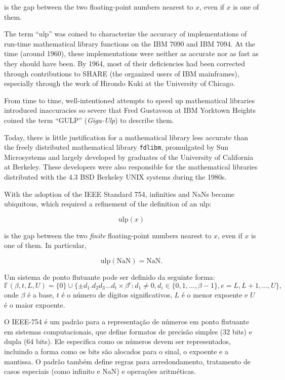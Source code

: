 is the gap between the two floating-point numbers nearest to $x$, 
even if $x$ is one of them.

The term ``ulp'' was coined to characterize the accuracy of implementations 
of run-time mathematical library functions on the IBM 7090 and IBM 7094. 
At the time (around 1960), these implementations were neither as accurate 
nor as fast as they should have been. By 1964, most of their deficiencies 
had been corrected through contributions to SHARE (the organized users of 
IBM mainframes), especially through the work of Hirondo Kuki at the 
University of Chicago.

From time to time, well-intentioned attempts to speed up mathematical 
libraries introduced inaccuracies so severe that Fred Gustavson at 
IBM Yorktown Heights coined the term ``GULP'' (\textit{Giga-Ulp}) to 
describe them. 

Today, there is little justification for a mathematical library less 
accurate than the freely distributed mathematical library \texttt{fdlibm}, 
promulgated by Sun Microsystems and largely developed by graduates of the 
University of California at Berkeley. These developers were also responsible 
for the mathematical libraries distributed with the 4.3 BSD Berkeley UNIX 
systems during the 1980s.

With the adoption of the IEEE Standard 754, infinities and NaNs became 
ubiquitous, which required a refinement of the definition of an ulp:

\begin{equation}
\mathrm{ulp}(x)
\end{equation}

is the gap between the two \textit{finite} floating-point numbers nearest 
to $x$, even if $x$ is one of them. In particular,

\begin{equation}
\mathrm{ulp}(\mathrm{NaN}) = \mathrm{NaN}.
\end{equation}

Um sistema de ponto flutuante pode ser definido da seguinte forma:
\begin{equation}
\mathbb{F}(\beta, t, L, U) = \{0\} \cup \{\pm d_1.d_2d_3 \ldots d_t \times \beta^e : d_1 \neq 0, d_i \in \{0, 1, \ldots, \beta-1\}, e = L, L+1, \ldots, U\},
\end{equation}
onde $\beta$ é a base, $t$ é o número de dígitos significativos, $L$ é o menor expoente e $U$ é o maior expoente. 

O IEEE-754 é um padrão para a representação de números em ponto flutuante em sistemas computacionais, que define formatos de precisão simples (32 bits) e dupla (64 bits). Ele especifica como os números devem ser representados, incluindo a forma como os bits são alocados para o sinal, o expoente e a mantissa. O padrão também define regras para arredondamento, tratamento de casos especiais (como infinito e NaN) e operações aritméticas.

